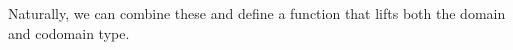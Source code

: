 \begin{code}%
\>[1]\AgdaSpace{}%
\AgdaSymbol{:}\AgdaSpace{}%
\AgdaSymbol{\{}\AgdaSpace{}%
\AgdaSymbol{:}\AgdaSpace{}%
\AgdaSpace{}%
\AgdaSymbol{\}\{}\AgdaSpace{}%
\AgdaSymbol{:}\AgdaSpace{}%
\AgdaSpace{}%
\AgdaSymbol{\}}\AgdaSpace{}%
\AgdaSpace{}%
\AgdaSymbol{(}\AgdaSpace{}%
\AgdaSpace{}%
\AgdaSymbol{)}\AgdaSpace{}%
\AgdaSpace{}%
\AgdaSymbol{(}\AgdaSymbol{\{}\AgdaSymbol{\}\{}\AgdaSymbol{\}}\AgdaSpace{}%
\AgdaSpace{}%
\AgdaSpace{}%
\AgdaSymbol{)}\<%
\\
%
\>[1]\AgdaSpace{}%
\AgdaSpace{}%
\AgdaSymbol{=}\AgdaSpace{}%
\AgdaSpace{}%
\AgdaSpace{}%
\AgdaSpace{}%
\AgdaSymbol{(}\AgdaSpace{}%
\AgdaSymbol{(}\AgdaSpace{}%
\AgdaSymbol{))}\<%
\\
%
\\[\AgdaEmptyExtraSkip]%
%
\>[1]\AgdaSpace{}%
\AgdaSymbol{:}\AgdaSpace{}%
\AgdaSymbol{\{}\AgdaSpace{}%
\AgdaSymbol{:}\AgdaSpace{}%
\AgdaSpace{}%
\AgdaSymbol{\}\{}\AgdaSpace{}%
\AgdaSymbol{:}\AgdaSpace{}%
\AgdaSpace{}%
\AgdaSymbol{\}}\AgdaSpace{}%
\AgdaSpace{}%
\AgdaSymbol{(}\AgdaSpace{}%
\AgdaSpace{}%
\AgdaSymbol{)}\AgdaSpace{}%
\AgdaSpace{}%
\AgdaSymbol{(}\AgdaSpace{}%
\AgdaSpace{}%
\AgdaSymbol{\{}\AgdaSymbol{\}\{}\AgdaSymbol{\}}\AgdaSpace{}%
\AgdaSymbol{)}\<%
\\
%
\>[1]\AgdaSpace{}%
\AgdaSpace{}%
\AgdaSymbol{=}\AgdaSpace{}%
\AgdaSpace{}%
\AgdaSpace{}%
\AgdaSpace{}%
\AgdaSpace{}%
\AgdaSymbol{(}\AgdaSpace{}%
\AgdaSymbol{)}\<%
\end{code}
\ccpad
Naturally, we can combine these and define a function that lifts both the domain and codomain type.
\ccpad
